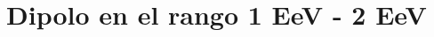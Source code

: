 \documentclass{ibtesis}
\begin{document}
\chapter{Dipolo en el rango 1 EeV - 2 EeV}
\graphicspath{{6_Dipole_1-2_EeV/}}



% 


% 

\begin{biblio}
	
\end{biblio}
\end{document}
